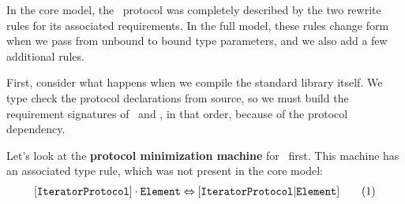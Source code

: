 \documentclass[../generics]{subfiles}
\begin{document}
\begin{example}
In the core model, the \tSequence\ protocol was completely described by the two rewrite rules for its associated requirements. In the full model, these rules change form when we pass from unbound to bound type parameters, and we also add a few additional rules.

First, consider what happens when we compile the standard library itself. We type check the protocol declarations from source, so we must build the requirement signatures of \tIterator\ and \tSequence, in that order, because of the protocol dependency.

Let's look at the \textbf{protocol minimization machine} for \tIterator\ first. This machine has an associated type rule, which was not present in the core model:
\begin{gather*}
[\texttt{IteratorProtocol}]\cdot\texttt{Element} \Leftrightarrow [\texttt{IteratorProtocol}|\texttt{Element}] \tag{1}
\end{gather*}


\end{example}
\end{document}
